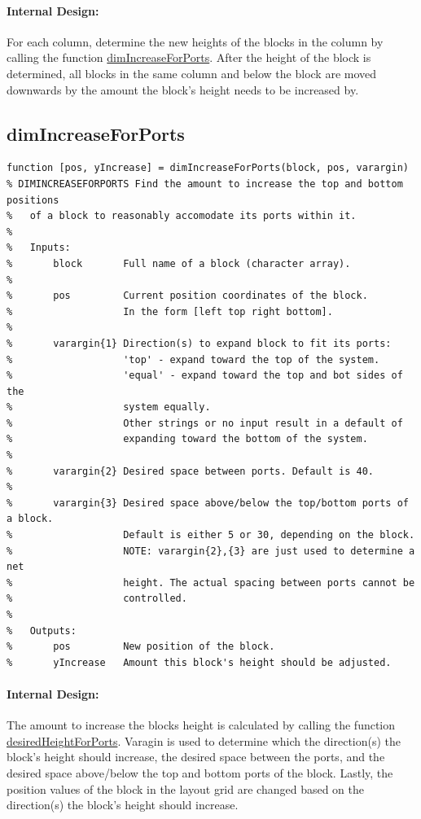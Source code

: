 \documentclass[12pt,letterpaper]{report}
\begin{document}
\paragraph{Internal Design:} For each column, determine the new heights of the blocks in the column by calling the function \hyperlink{dimIncreaseForPorts}{dimIncreaseForPorts}. After the height of the block is determined, all blocks in the same column and below the block are moved downwards by the amount the block's height needs to be increased by.

\subsection{dimIncreaseForPorts} \label{dimIncreaseForPorts}
\begin{lstlisting}
function [pos, yIncrease] = dimIncreaseForPorts(block, pos, varargin)
% DIMINCREASEFORPORTS Find the amount to increase the top and bottom positions
%   of a block to reasonably accomodate its ports within it.
%
%   Inputs:
%       block       Full name of a block (character array).
%
%       pos         Current position coordinates of the block.
%                   In the form [left top right bottom].
%
%       varargin{1} Direction(s) to expand block to fit its ports:
%                   'top' - expand toward the top of the system.
%                   'equal' - expand toward the top and bot sides of the
%                   system equally.
%                   Other strings or no input result in a default of
%                   expanding toward the bottom of the system.
%
%       varargin{2} Desired space between ports. Default is 40.
%
%       varargin{3} Desired space above/below the top/bottom ports of a block.
%                   Default is either 5 or 30, depending on the block.
%                   NOTE: varargin{2},{3} are just used to determine a net
%                   height. The actual spacing between ports cannot be
%                   controlled.
%
%   Outputs:
%       pos         New position of the block.
%       yIncrease   Amount this block's height should be adjusted.
\end{lstlisting}
\paragraph{Internal Design:} The amount to increase the blocks height is calculated by calling the function \hyperref[desiredHeightForPorts]{desiredHeightForPorts}. Varagin is used to determine which the direction(s) the block's height should increase, the desired space between the ports, and the desired space above/below the top  and bottom ports of the block. Lastly, the position values of the block in the layout grid are changed based on the direction(s) the block's height should increase.
\end{document}

